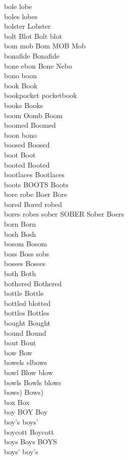 bole lobe\\
boles lobes\\
bolster Lobster\\
bolt Blot Bolt blot\\
bom mob Bom MOB Mob\\
bonafide Bonafide\\
bone ebon Bone Nebo\\
bono boon\\
book Book\\
bookpocket pocketbook\\
books Books\\
boom Oomb Boom\\
boomed Boomed\\
boon bono\\
boosed Boosed\\
boot Boot\\
booted Booted\\
bootlaces Bootlaces\\
boots BOOTS Boots\\
bore robe Boer Bore\\
bored Bored robed\\
bores robes sober SOBER Sober Boers\\
born Born\\
bosh Bosh\\
bosom Bosom\\
boss Boss sobs\\
bosses Bosses\\
both Both\\
bothered Bothered\\
bottle Bottle\\
bottled blotted\\
bottles Bottles\\
bought Bought\\
bound Bound\\
bout Bout\\
bow Bow\\
bowels elbows\\
bowl Blow blow\\
bowls Bowls blows\\
bows) Bows)\\
box Box\\
boy BOY Boy\\
boy's boys'\\
boycott Boycott\\
boys Boys BOYS\\
boys' boy's\\
